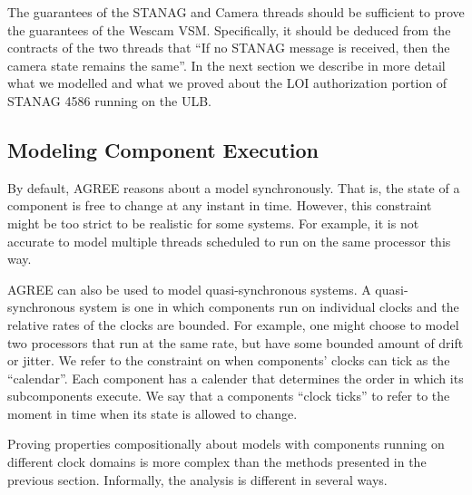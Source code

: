 \documentclass{llncs}
\begin{document}
The guarantees of the STANAG and Camera threads should be sufficient to prove the guarantees of the Wescam VSM.  Specifically, it should be deduced from the contracts of the two threads that ``If no STANAG message is received, then the camera state remains the same''.  In the next section we describe in more detail what we modelled and what we proved about the LOI authorization portion of STANAG 4586 running on the ULB.

\subsection{Modeling Component Execution}

By default, AGREE reasons about a model synchronously. That is, the state of a component is free to change at any instant in time.  However, this constraint might be too strict to be realistic for some systems.  For example, it is not accurate to model multiple threads scheduled to run on the same processor this way.

AGREE can also be used to model quasi-synchronous systems.  A quasi-synchronous system is one in which components run on individual clocks and the relative rates of the clocks are bounded.  For example, one might choose to model two processors that run at the same rate, but have some bounded amount of drift or jitter.  We refer to the constraint on when components' clocks can tick as the ``calendar''. Each component has a calender that determines the order in which its subcomponents execute. We say that a components ``clock ticks'' to refer to the moment in time when its state is allowed to change.

Proving properties compositionally about models with components running on different clock domains is more complex than the methods presented in the previous section.  Informally, the analysis is different in several ways.
\end{document}
